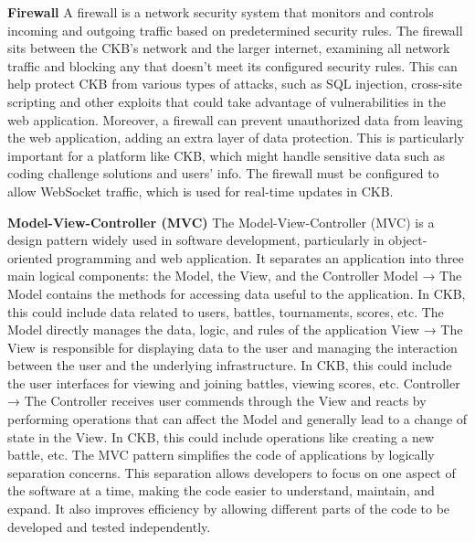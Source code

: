 \textbf{Firewall}\newline
A firewall is a network security system that monitors and controls incoming and outgoing traffic based on predetermined security rules. 
The firewall sits between the CKB’s network and the larger internet, examining all network traffic and blocking any 
that doesn’t meet its configured security rules. This can help protect CKB from various types of attacks, 
such as SQL injection, cross-site scripting and other exploits that could take advantage of vulnerabilities in the web application. 
Moreover, a firewall can prevent unauthorized data from leaving the web application, adding an extra layer of data protection. 
This is particularly important for a platform like CKB, which might handle sensitive data such as coding challenge solutions and users’ info. 
The firewall must be configured to allow WebSocket traffic, which is used for real-time updates in CKB.


\textbf{Model-View-Controller (MVC)}\newline
The Model-View-Controller (MVC) is a design pattern widely used in software development, particularly in object-oriented programming and web application. 
It separates an application into three main logical components: the Model, the View, and the Controller\newline
Model → The Model contains the methods for accessing data useful to the application. 
In CKB, this could include data related to users, battles, tournaments, scores, etc. The Model directly manages the data, logic, and rules of the application\newline
View → The View is responsible for displaying data to the user and managing the interaction between the user and the underlying infrastructure. 
In CKB, this could include the user interfaces for viewing and joining battles, viewing scores, etc.\newline
Controller → The Controller receives user commends through the View and reacts by performing operations that can affect the Model and 
generally lead to a change of state in the View. In CKB, this could include operations like creating a new battle, etc.\newline
The MVC pattern simplifies the code of applications by logically separation concerns. 
This separation allows developers to focus on one aspect of the software at a time, making the code easier to understand, maintain, and expand. 
It also improves efficiency by allowing different parts of the code to be developed and tested independently.

